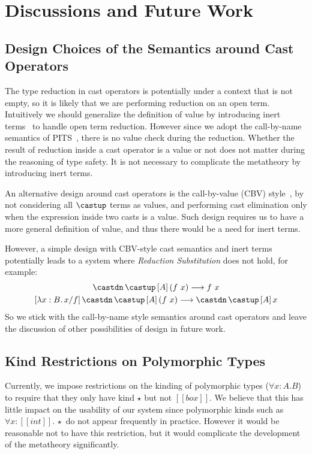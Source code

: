 \section{Discussions and Future Work}

\subsection{Design Choices of the Semantics around Cast Operators}
\label{sec:cast-design}

The type reduction in cast operators is potentially under a context that
is not empty, so it is likely that we are performing reduction on an open term.
Intuitively we should generalize the definition of value by introducing inert
terms~\cite{full} to handle open term reduction.
However since we adopt the call-by-name semantics of PITS~\cite{yang2019pure},
there is no value check during the reduction. Whether the result of reduction
inside a cast operator is a value or not does not matter during the reasoning of
type safety. It is not necessary to complicate the metatheory by introducing inert terms.

An alternative design
around cast operators is the call-by-value (CBV) style~\cite{yang2019pure},
by not considering all $\castup$ terms as values, and performing cast elimination only
when the expression inside two casts is a value. Such design requires us to
have a more general definition of value, and thus there would be a need for inert terms.

However, a simple design with CBV-style cast semantics and inert terms
potentially leads to a system where \emph{Reduction Substitution} does not hold,
for example:
\begin{gather*}
    \castdn \, \castup \, [A] \, (f ~ x) \longrightarrow f ~ x \\
    [\lambda x : B. \, x / f] \, \castdn \, \castup \, [A] \, (f ~ x) \longrightarrow \castdn \, \castup \, [A] \, x
\end{gather*}
So we stick with the call-by-name style semantics around cast operators and
leave the discussion of other possibilities of design in future work.

\subsection{Kind Restrictions on Polymorphic Types}

Currently, we impose restrictions on the kinding of polymorphic types
($\forall x : A. B$) to require that they only have kind $\star$ but not $[[box]]$.
We believe that this has little impact on the usability
of our system since polymorphic kinds such as $\forall x : [[int]].\,\star$
do not appear frequently in practice.
However it would be reasonable not to have this restriction, but it would
complicate the development of the metatheory significantly.

